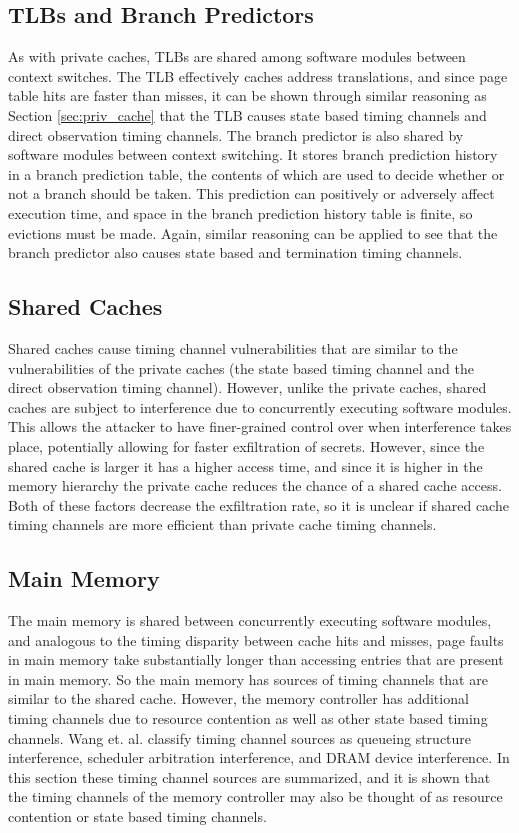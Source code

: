 \subsection{TLBs and Branch Predictors}
As with private caches, TLBs are shared among software modules between context 
switches. The TLB effectively caches address translations, and since page table 
hits are faster than misses, it can be shown through similar reasoning as 
Section \ref{sec:priv_cache} that the TLB causes state based timing channels 
and direct observation timing channels. The branch predictor is also shared by 
software modules between context switching. It stores branch prediction history 
in a branch prediction table, the contents of which are used to decide whether 
or not a branch should be taken. This prediction can positively or adversely 
affect execution time, and space in the branch prediction history table is 
finite, so evictions must be made. Again, similar reasoning can be applied to 
see that the branch predictor also causes state based and termination timing 
channels.

\subsection{Shared Caches}
Shared caches cause timing channel vulnerabilities that are similar to the 
vulnerabilities of the private caches (the state based timing channel and the 
direct observation timing channel). However, unlike the private caches, shared 
caches are subject to interference due to concurrently executing software 
modules. This allows the attacker to have finer-grained control over when 
interference takes place, potentially allowing for faster exfiltration of 
secrets. However, since the shared cache is larger it has a higher access time, 
and since it is higher in the memory hierarchy the private cache reduces the 
chance of a shared cache access. Both of these factors decrease the 
exfiltration rate, so it is unclear if shared cache timing channels are more 
efficient than private cache timing channels.

\subsection{Main Memory}
The main memory is shared between concurrently executing software modules, and 
analogous to the timing disparity between cache hits and misses, page faults in 
main memory take substantially longer than accessing entries that are present 
in main memory. So the main memory has sources of timing channels that are 
similar to the shared cache. However, the memory controller has additional 
timing channels due to resource contention as well as other state based timing 
channels. Wang et. al. classify timing channel sources as queueing structure 
interference, scheduler arbitration interference, and DRAM device interference.  
In this section these timing channel sources are summarized, and it is shown 
that the timing channels of the memory controller may also be thought of as 
resource contention or state based timing channels.

